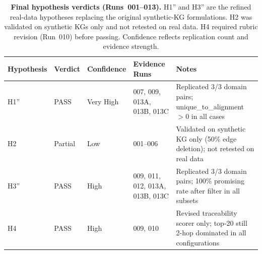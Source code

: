 \begin{table}[h]
\caption{%
  \textbf{Final hypothesis verdicts (Runs~001--013).}
  H1'' and H3'' are the refined real-data hypotheses replacing the original
  synthetic-KG formulations.
  H2 was validated on synthetic KGs only and not retested on real data.
  H4 required rubric revision (Run~010) before passing.
  Confidence reflects replication count and evidence strength.
}
\label{tab:hypothesis_status}
\small
\begin{tabularx}{\linewidth}{llllX}
\toprule
Hypothesis & Verdict & Confidence & Evidence Runs & Notes \\
\midrule
H1'' & PASS & Very High &
  007, 009, 013A, 013B, 013C &
  Replicated 3/3 domain pairs; unique\_to\_alignment $>$0 in all cases \\
\addlinespace
H2  & Partial & Low &
  001--006 &
  Validated on synthetic KG only (50\% edge deletion);
  not retested on real data \\
\addlinespace
H3'' & PASS & High &
  009, 011, 012, 013A, 013B, 013C &
  Replicated 3/3 domain pairs;
  100\% promising rate after filter in all subsets \\
\addlinespace
H4  & PASS & High &
  009, 010 &
  Revised traceability scorer only;
  top-20 still 2-hop dominated in all configurations \\
\bottomrule
\end{tabularx}
\end{table}
